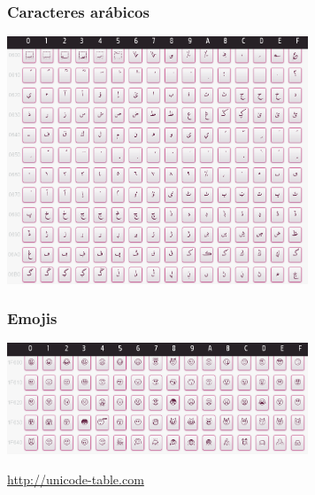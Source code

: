 \begin{frame}
\frametitle{Caracteres arábicos}

\begin{center}
\includegraphics[width=9cm]{figs/unicode-0600}
\end{center}

\end{frame}

\begin{frame}
\frametitle{Emojis}

\begin{center}
\includegraphics[width=9cm]{figs/unicode-emoji}
\end{center}

\begin{flushright}
  \url{http://unicode-table.com}
\end{flushright}
\end{frame}

